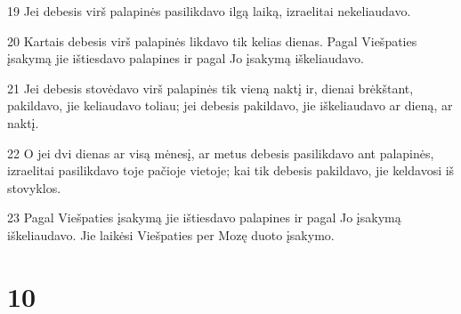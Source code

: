 \par 19 Jei debesis virš palapinės pasilikdavo ilgą laiką, izraelitai nekeliaudavo. 
\par 20 Kartais debesis virš palapinės likdavo tik kelias dienas. Pagal Viešpaties įsakymą jie ištiesdavo palapines ir pagal Jo įsakymą iškeliaudavo. 
\par 21 Jei debesis stovėdavo virš palapinės tik vieną naktį ir, dienai brėkštant, pakildavo, jie keliaudavo toliau; jei debesis pakildavo, jie iškeliaudavo ar dieną, ar naktį. 
\par 22 O jei dvi dienas ar visą mėnesį, ar metus debesis pasilikdavo ant palapinės, izraelitai pasilikdavo toje pačioje vietoje; kai tik debesis pakildavo, jie keldavosi iš stovyklos. 
\par 23 Pagal Viešpaties įsakymą jie ištiesdavo palapines ir pagal Jo įsakymą iškeliaudavo. Jie laikėsi Viešpaties per Mozę duoto įsakymo.



\chapter{10}


